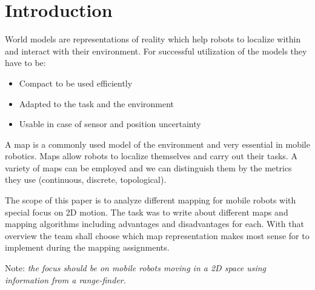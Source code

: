 \documentclass[12pt, a4paper, onecolumn]{article}
\begin{document}
\maketitle

\section{Introduction}
World models are representations of reality which help robots to localize within and interact with their environment. For successful utilization of the models they have to be:
\begin{itemize}
  \item Compact to be used efficiently
  \item Adapted to the task and the environment
  \item Usable in case of sensor and position uncertainty
  \end{itemize}
A map is a commonly used model of the environment and very essential in mobile robotics. Maps allow robots to localize themselves and carry out their tasks. A variety of maps can be employed and we can distinguish them by the metrics they use (continuous, discrete, topological).\par
The scope of this paper is to analyze different mapping for mobile robots with special focus on 2D motion. The task was to write about different maps and mapping algorithms including advantages and disadvantages for each. With that overview the team shall choose which map representation makes most sense for to implement during the mapping assignments. \par
Note: \emph{the focus should be on mobile robots moving in a 2D space using information from a range-finder.}

\end{document}
